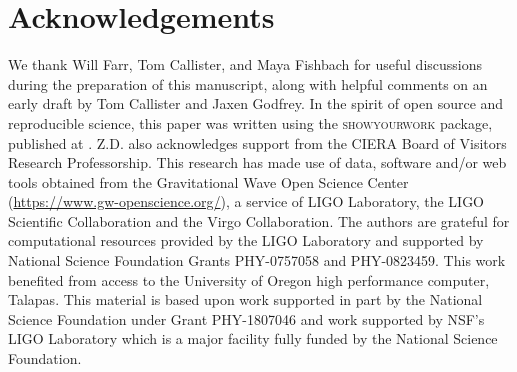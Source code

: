 \documentclass[twocolumn]{aastex631}
\begin{document}








\section{Acknowledgements}\label{sec:acknowledments}
We thank Will Farr, Tom Callister, and Maya Fishbach for useful discussions during the preparation of this manuscript, 
along with helpful comments on an early draft by Tom Callister and Jaxen Godfrey. In the spirit of open source and reproducible science, this paper was written using the \textsc{showyourwork} package, published at \GitHubURL \citep{Luger2021}. Z.D. also acknowledges support from the CIERA Board
of Visitors Research Professorship. This research has made use of data, software and/or web tools obtained from the Gravitational Wave Open Science Center 
(\url{https://www.gw-openscience.org/}), a service of LIGO Laboratory, the LIGO Scientific Collaboration and the Virgo Collaboration. 
The authors are grateful for computational resources provided by the LIGO Laboratory and supported by National Science Foundation Grants PHY-0757058 and PHY-0823459.  
This work benefited from access to the University of Oregon high performance computer, Talapas. This material is based upon work supported 
in part by the National Science Foundation under Grant PHY-1807046 and work supported by NSF's LIGO Laboratory which is a major facility 
fully funded by the National Science Foundation.


{}



\end{document}
